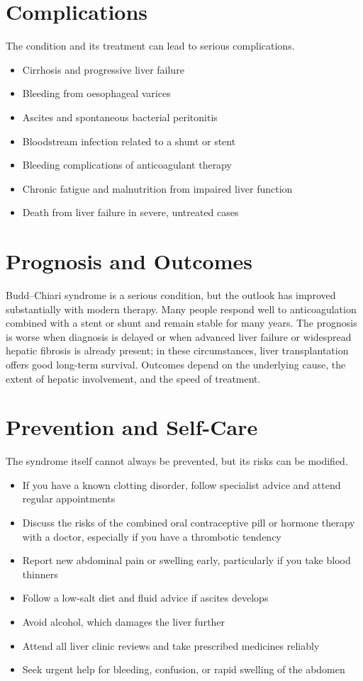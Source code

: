 \section*{Complications}
The condition and its treatment can lead to serious complications.

\begin{itemize}
    \item Cirrhosis and progressive liver failure
    \item Bleeding from oesophageal varices
    \item Ascites and spontaneous bacterial peritonitis
    \item Bloodstream infection related to a shunt or stent
    \item Bleeding complications of anticoagulant therapy
    \item Chronic fatigue and malnutrition from impaired liver function
    \item Death from liver failure in severe, untreated cases
\end{itemize}

\section*{Prognosis and Outcomes}
Budd--Chiari syndrome is a serious condition, but the outlook has improved substantially with modern therapy. Many people respond well to anticoagulation combined with a stent or shunt and remain stable for many years. The prognosis is worse when diagnosis is delayed or when advanced liver failure or widespread hepatic fibrosis is already present; in these circumstances, liver transplantation offers good long-term survival. Outcomes depend on the underlying cause, the extent of hepatic involvement, and the speed of treatment.

\section*{Prevention and Self-Care}
The syndrome itself cannot always be prevented, but its risks can be modified.

\begin{itemize}
    \item If you have a known clotting disorder, follow specialist advice and attend regular appointments
    \item Discuss the risks of the combined oral contraceptive pill or hormone therapy with a doctor, especially if you have a thrombotic tendency
    \item Report new abdominal pain or swelling early, particularly if you take blood thinners
    \item Follow a low-salt diet and fluid advice if ascites develops
    \item Avoid alcohol, which damages the liver further
    \item Attend all liver clinic reviews and take prescribed medicines reliably
    \item Seek urgent help for bleeding, confusion, or rapid swelling of the abdomen
\end{itemize}

